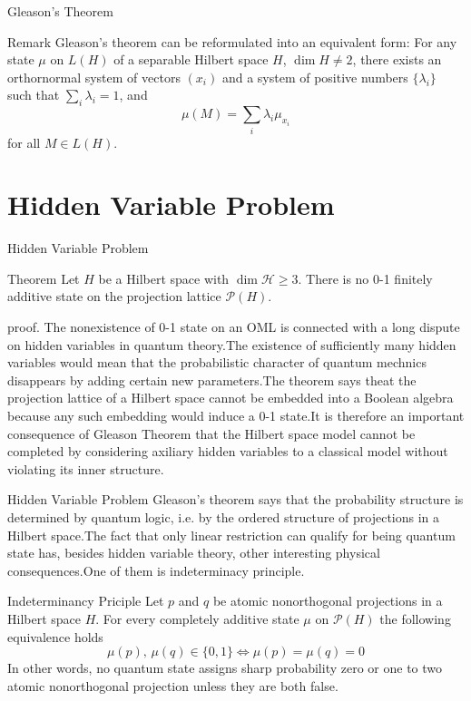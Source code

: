\documentclass{beamer}
\begin{document}
\begin{frame}{Gleason's Theorem}
\begin{block}{Remark}
    Gleason's theorem can be reformulated into an equivalent form: For any state \(\mu\) on \(L(H)\) of a separable Hilbert space \(H\), \(\dim H \neq 2\), there exists an orthornormal system of vectors \((x_i)\) and a system of positive numbers \(\{\lambda_i\}\) such that \(\sum_i \lambda_i=1\), and \[\mu(M) = \sum_i \lambda_i \mu_{x_i}\]
    for all \(M \in L(H)\).
\end{block}
\end{frame}

\section{Hidden Variable Problem}
\begin{frame}{Hidden Variable Problem}
    \begin{block}{Theorem} Let \(H\) be a Hilbert space with \(\dim \mathcal{H}\ge 3\). There is no 0-1 finitely additive state on the projection lattice \(\mathcal{P}(H)\).
    \end{block}\pause
    proof. \cite[Theorem 3.4.1]{MR2015280}
    The nonexistence of 0-1 state on an OML is connected with a long dispute on hidden variables in quantum theory.\pause The existence of sufficiently many hidden variables would mean that the probabilistic character of quantum mechnics disappears by adding certain new parameters.\pause The theorem says theat the projection lattice of a Hilbert space cannot be embedded into a Boolean algebra because any such embedding would induce a 0-1 state.\pause It is therefore an important consequence of Gleason Theorem that the Hilbert space model cannot be completed by considering axiliary hidden variables to a classical model without violating its inner structure.

   
\end{frame}
\begin{frame}{Hidden Variable Problem}
 Gleason's theorem says that the probability structure is determined by quantum logic, i.e. by the ordered structure of projections in a Hilbert space.\pause The fact that only linear restriction can qualify for being quantum state has, besides hidden variable theory, other interesting physical consequences.\pause One of them is indeterminacy principle. \cite[p.87-93]{MR2015280}
 \begin{block}{Indeterminancy Priciple}
    Let \(p\) and \(q\) be atomic nonorthogonal projections in a Hilbert space \(H\). For every completely additive state \(\mu\) on \(\mathcal{P}(H)\) the following equivalence holds
    \[\mu(p),\,\mu(q) \in \{0,1\} \Leftrightarrow \mu(p)=\mu(q)=0\]
    In other words, no quantum state assigns sharp probability zero or one to two atomic nonorthogonal projection unless they are both false.
 \end{block}   
    
\end{frame}
\end{document}
